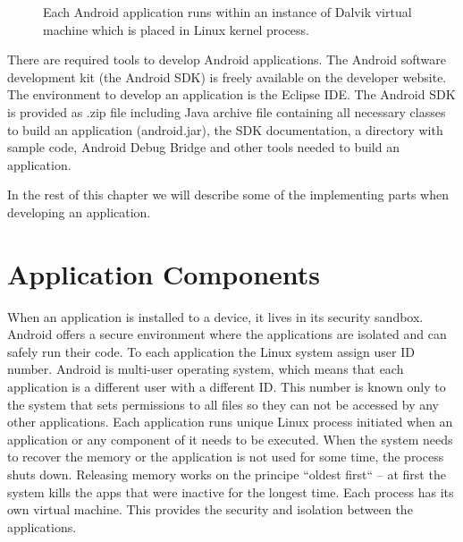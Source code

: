 \begin{figure}[h!]
    \caption{Each Android application runs within an instance of Dalvik virtual machine which is placed in Linux kernel process.}
\end{figure}

There are required tools to develop Android applications.
The Android software development kit (the Android SDK) is freely available on the developer website.
The environment to develop an application is the Eclipse IDE.
The Android SDK is provided as \@.zip file including Java archive file containing all necessary classes to build an application (android\@.jar),
the SDK documentation, a directory with sample code, Android Debug Bridge and other tools needed to build an application.

In the rest of this chapter we will describe some of the implementing parts when developing an application.

\section{Application Components}
When an application is installed to a device, it lives in its security sandbox.
Android offers a secure environment where the applications are isolated and can safely run their code.
To each application the Linux system assign user ID number. 
Android is multi-user operating system, which means that each application is a different user with a different ID.
This number is known only to the system that sets permissions to all files so they can not be accessed by any other applications.
Each application runs unique Linux process initiated when an application or any component of it needs to be executed.
When the system needs to recover the memory or the application is not used for some time, the process shuts down.
Releasing memory works on the principe ``oldest first`` -- at first the system kills the apps that were inactive for the longest time.
Each process has its own virtual machine. This provides the security and isolation between the applications.

